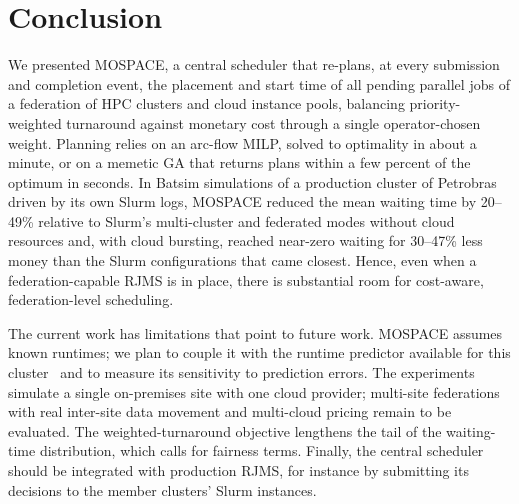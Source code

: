 \documentclass[conference]{IEEEtran}
\begin{document}
\section{Conclusion}
\label{sec:conclusion}

We presented MOSPACE, a central scheduler that re-plans, at every submission and completion event, the placement and start time of all pending parallel jobs of a federation of HPC clusters and cloud instance pools, balancing priority-weighted turnaround against monetary cost through a single operator-chosen weight. Planning relies on an arc-flow MILP, solved to optimality in about a minute, or on a memetic GA that returns plans within a few percent of the optimum in seconds. In Batsim simulations of a production cluster of Petrobras driven by its own Slurm logs, MOSPACE reduced the mean waiting time by 20--49\% relative to Slurm's multi-cluster and federated modes without cloud resources and, with cloud bursting, reached near-zero waiting for 30--47\% less money than the Slurm configurations that came closest. Hence, even when a federation-capable RJMS is in place, there is substantial room for cost-aware, federation-level scheduling.

The current work has limitations that point to future work. MOSPACE assumes known runtimes; we plan to couple it with the runtime predictor available for this cluster~\cite{Nunes2025} and to measure its sensitivity to prediction errors. The experiments simulate a single on-premises site with one cloud provider; multi-site federations with real inter-site data movement and multi-cloud pricing remain to be evaluated. The weighted-turnaround objective lengthens the tail of the waiting-time distribution, which calls for fairness terms. Finally, the central scheduler should be integrated with production RJMS, for instance by submitting its decisions to the member clusters' Slurm instances.



\end{document}
